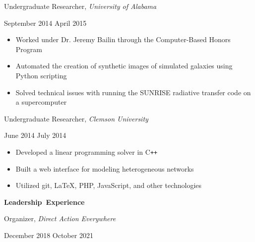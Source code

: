 \documentclass[11pt]{article}
\begin{document}
\vspace{0.4em}
\begin{minipage}[t]{0.65\textwidth}
\flushleft
Undergraduate Researcher, \textit{University of Alabama}\\
\end{minipage}
\begin{minipage}[t]{0.30\textwidth}
\flushright
September 2014 \space \textemdash \space April 2015\\
\end{minipage}

\begin{itemize}
  \item Worked under Dr. Jeremy Bailin through the Computer-Based Honors Program
  \item Automated the creation of synthetic images of simulated galaxies using Python scripting
  \item Solved technical issues with running the SUNRISE radiative transfer code on a supercomputer
\end{itemize}

\begin{minipage}[t]{0.65\textwidth}
\flushleft
Undergraduate Researcher, \textit{Clemson University}\\
\end{minipage}
\begin{minipage}[t]{0.30\textwidth}
\flushright
June 2014 \space \textemdash \space July 2014\\
\end{minipage}

\begin{itemize}
  \item Developed a linear programming solver in C\texttt{++}
  \item Built a web interface for modeling heterogeneous networks
  \item Utilized git, \LaTeX, PHP, JavaScript, and other technologies
\end{itemize}

\vspace{0.8em}
\hbox{\large \textbf{Leadership Experience}}

\vspace{0.4em}
\begin{minipage}[t]{0.65\textwidth}
\flushleft
Organizer, \textit{Direct Action Everywhere}\\
\end{minipage}
\begin{minipage}[t]{0.30\textwidth}
\flushright
December 2018 \space \textemdash \space October 2021\\
\end{minipage}
\end{document}
